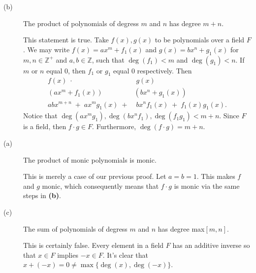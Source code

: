 \documentclass[../hw_sols.tex]{subfiles}
\begin{document}
\begin{description}

\item[(b)] The product of polynomials of degress $m$ and $n$ has degree $m+n$.

\begin{solution}
This statement is true. Take $f(x), g(x)$ to be polynomials over a field $F$. 
We may write $f(x) = ax^{m} + f_1(x)$ and $g(x) = bx^{n} + g_1(x)$ for 
$m,n \in \mathbb{Z}^+$ and $a,b \in \mathbb{Z}$, such that $\deg(f_1) < m$ and 
$\deg(g_1) < n$. If $m$ or $n$ equal 0, then $f_1$ or $g_1$ equal 0 
respectively. Then 
\begin{align*}
	f(x) \; \cdot& \; g(x) \\
	(ax^m + f_1(x))&(bx^n + g_1(x)) \\
	abx^{m+n} \; + \; ax^mg_1(x) \; +& \; bx^nf_1(x) \; + \; f_1(x)g_1(x).
\end{align*}
Notice that $\deg(ax^mg_1), \deg(bx^nf_1), \deg(f_1g_1) < m + n$. Since $F$ 
is a field, then $f \cdot g \in F$. Furthermore, $\deg(f \cdot g) = m + n$.
\end{solution}

\item[(a)] The product of monic polynomials is monic.

\begin{solution}
This is merely a case of our previous proof. Let $a = b = 1$. This makes $f$ 
and $g$ monic, which consequently means that $f \cdot g$ is monic via the 
same steps in \textbf{(b)}.
\end{solution}

\item[(c)] The sum of polynomials of degress $m$ and $n$ has degree max$[m,n]$.

\begin{solution}
This is certainly false. Every element in a field $F$ has an additive inverse 
so that $x \in F$ implies $-x \in F$. It's clear that 
$x + (-x) = 0 \neq \max\{\deg(x),\deg(-x)\}$.
\end{solution}

\end{description}


\newpage


\end{document}
